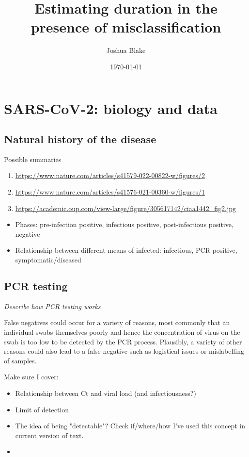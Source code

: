 \documentclass[thesis.tex]{subfiles}
\title{Estimating duration in the presence of misclassification}
\author{Joshua Blake}
\date{\today}
\begin{document}
\ifSubfilesClassLoaded{
  \setcounter{chapter}{1}
}

\chapter{SARS-CoV-2: biology and data} \label{intro:sec:studies}

\section{Natural history of the disease}

Possible summaries
\begin{enumerate}
  \item \url{https://www.nature.com/articles/s41579-022-00822-w/figures/2}
  \item \url{https://www.nature.com/articles/s41576-021-00360-w/figures/1}
  \item \url{https://academic.oup.com/view-large/figure/305617142/ciaa1442_fig2.jpg}
\end{enumerate}

\begin{itemize}
  \item Phases: pre-infection positive, infectious positive, post-infectious positive, negative
  \item Relationship between different means of infected: infectious, PCR positive, symptomatic/diseased
\end{itemize}

\section{PCR testing} \label{biology-data:sec:PCR}

\emph{Describe how PCR testing works}

False negatives could occur for a variety of reasons, most commonly that an individual swabs themselves poorly and hence the concentration of virus on the swab is too low to be detected by the PCR process.
Plausibly, a variety of other reasons could also lead to a false negative such as logistical issues or mislabelling of samples.

Make sure I cover:
\begin{itemize}
  \item Relationship between Ct and viral load (and infectiousness?)
  \item Limit of detection
  \item The idea of being "detectable"? Check if/where/how I've used this concept in current version of text.
  \item 
\end{itemize}
\end{document}
